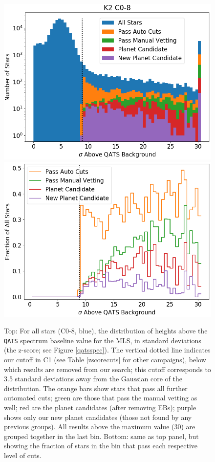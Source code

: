 \documentclass[twocolumn]{aastex62}
\newcommand{\pipeline}[1]{\texttt{#1}}
\begin{document}
\begin{figure}[tbp]
\includegraphics[width=\columnwidth]{passvet_total.png}
\includegraphics[width=\columnwidth]{passvet_fraction.png}
\caption{Top: For all stars (C0-8, blue), the distribution of heights
  above the \pipeline{QATS} spectrum baseline value for the MLS, in
  standard deviations (the z-score; see Figure \ref{qatsspec}). The
  vertical dotted line indicates our cutoff in C1 (see Table
  \ref{zscorecuts} for other campaigns), below which results are
  removed from our search; this cutoff corresponds to 3.5 standard
  deviations away from the Gaussian core of the distribution. The
  orange bars show stars that pass all further automated cuts; green
  are those that pass the manual vetting as well; red are the planet
  candidates (after removing EBs); purple shows only our new planet
  candidates (those not found by any previous groups). All results
  above the maximum value (30) are grouped together in the last bin.
  Bottom: same as top panel, but showing the fraction of stars in the
  bin that pass each respective level of cuts.
\label{passvet}}
\end{figure}
\end{document}
